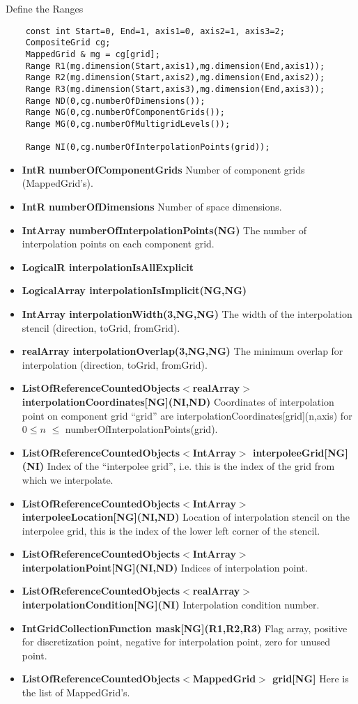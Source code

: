 Define the Ranges 
{\footnotesize
\begin{verbatim}
    const int Start=0, End=1, axis1=0, axis2=1, axis3=2;
    CompositeGrid cg;
    MappedGrid & mg = cg[grid];
    Range R1(mg.dimension(Start,axis1),mg.dimension(End,axis1));
    Range R2(mg.dimension(Start,axis2),mg.dimension(End,axis2));
    Range R3(mg.dimension(Start,axis3),mg.dimension(End,axis3));
    Range ND(0,cg.numberOfDimensions());
    Range NG(0,cg.numberOfComponentGrids());
    Range MG(0,cg.numberOfMultigridLevels());

    Range NI(0,cg.numberOfInterpolationPoints(grid));
\end{verbatim}
}

\begin{itemize}
\item {\bf IntR numberOfComponentGrids}  Number of component grids (MappedGrid's).
\item {\bf IntR numberOfDimensions}  Number of space dimensions.
\item {\bf IntArray numberOfInterpolationPoints(NG)}
      The number of interpolation points on each component grid.           
\item {\bf LogicalR interpolationIsAllExplicit}
\item {\bf LogicalArray interpolationIsImplicit(NG,NG)}
\item {\bf IntArray interpolationWidth(3,NG,NG)}
       The width of the interpolation stencil (direction, toGrid, fromGrid). 
\item {\bf realArray interpolationOverlap(3,NG,NG)}
       The minimum overlap for interpolation (direction, toGrid, fromGrid).     
\item {\bf ListOfReferenceCountedObjects$<$realArray$>$ interpolationCoordinates[NG](NI,ND)} 
       Coordinates of interpolation point on component grid ``grid'' are
       {\ff interpolationCoordinates[grid](n,axis)} for $0\le n $ $\le$ 
       {\ff number\-Of\-Interpolation\-Points(grid)}.
\item {\bf ListOfReferenceCountedObjects$<$IntArray$>$ interpoleeGrid[NG](NI)}
       Index of the ``interpolee grid'', i.e. this is the index of the grid from
       which we interpolate.
\item {\bf ListOfReferenceCountedObjects$<$IntArray$>$   interpoleeLocation[NG](NI,ND)}
       Location of interpolation stencil on the interpolee grid, this is the
       index of the lower left corner of the stencil.
\item {\bf ListOfReferenceCountedObjects$<$IntArray$>$   interpolationPoint[NG](NI,ND)}
       Indices of interpolation point.                                  
\item {\bf ListOfReferenceCountedObjects$<$realArray$>$ interpolationCondition[NG](NI)}
       Interpolation condition number.                       
\item {\bf IntGridCollectionFunction mask[NG](R1,R2,R3)}
       Flag array, positive for discretization point, negative for interpolation point,
       zero for unused point.
\item {\bf ListOfReferenceCountedObjects$<$MappedGrid$>$ grid[NG]}
       Here is the list of MappedGrid's.
\end{itemize}

